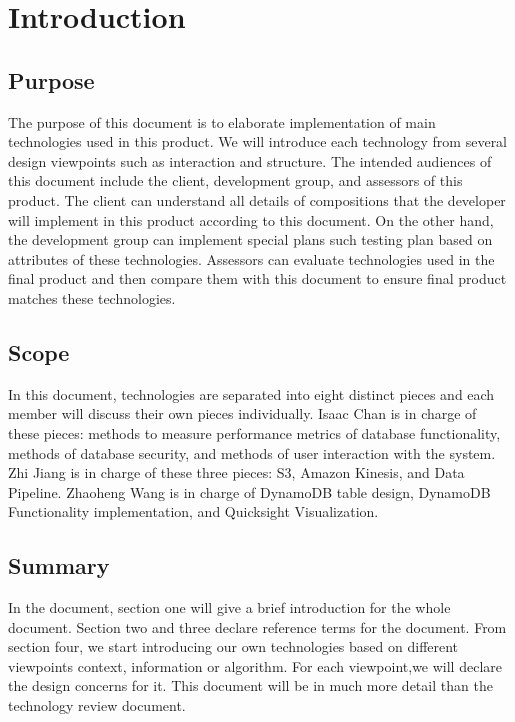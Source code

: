 \section{Introduction}
\subsection{Purpose}
The purpose of this document is to elaborate implementation of main technologies used in this product. We will introduce each technology from several design viewpoints such as interaction and structure. The intended audiences of this document include the client, development group, and assessors of this product. The client can understand all details of compositions that the developer will implement in this product according to this document. On the other hand, the development group can implement special plans such testing plan based on attributes of these technologies. Assessors can evaluate technologies used in the final product and then compare them with this document to ensure final product matches these technologies.  

\subsection{Scope}
In this document, technologies are separated into eight distinct pieces and each member will discuss their own pieces individually. Isaac Chan is in charge of these pieces: methods to measure performance metrics of database functionality, methods of database security, and methods of user interaction with the system. Zhi Jiang is in charge of these three pieces: S3, Amazon Kinesis, and Data Pipeline. Zhaoheng Wang is in charge of DynamoDB table design, DynamoDB Functionality implementation, and Quicksight Visualization.

\subsection{Summary}
In the document, section one will give a brief introduction for the whole document. Section two and three declare reference terms for the document. From section four, we start introducing our own technologies based on different viewpoints context, information or algorithm. For each viewpoint,we will declare the design concerns for it. This document will be in much more detail than the technology review document.  
 
